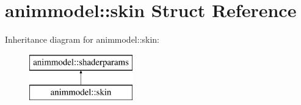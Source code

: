 \hypertarget{structanimmodel_1_1skin}{}\section{animmodel\+:\+:skin Struct Reference}
\label{structanimmodel_1_1skin}
Inheritance diagram for animmodel\+:\+:skin\+:\begin{figure}[H]
\begin{center}
\leavevmode
\includegraphics[height=2.000000cm]{structanimmodel_1_1skin}
\end{center}
\end{figure}
